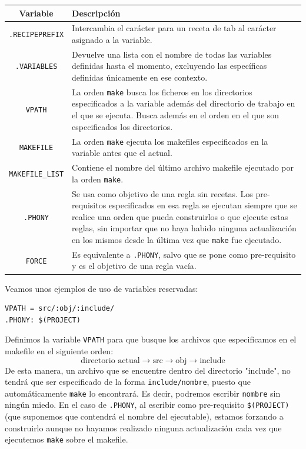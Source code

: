\documentclass[11pt,twoside,titlepage,a4paper]{article}
\theoremstyle{definition}
\theoremstyle{plain_rojo}
\theoremstyle{remark}
\begin{document}
\begin{center}
\begin{tabular}{|c|p{12.7cm}|}
\hline
	\textbf{\textcolor{burdeos}{Variable}} & 
	\textbf{\textcolor{burdeos}{Descripción}} \\
\hline
	\texttt{.RECIPEPREFIX} & 
	Intercambia el carácter para un receta de tab al carácter asignado a la 
	variable.\\
\hline
	\texttt{.VARIABLES} &
	Devuelve una lista con el nombre de todas las variables definidas hasta 
	el momento, excluyendo las específicas definidas únicamente en ese 
	contexto.\\
\hline
	\texttt{VPATH} & 
	La orden \texttt{make} busca los ficheros en los directorios
	especificados a la 	variable además del directorio de trabajo en el que
	se ejecuta. Busca además en el orden en el que son especificados los
	directorios.\\
\hline
	\texttt{MAKEFILE} & 
	La orden \texttt{make} ejecuta los makefiles especificados en la variable 
	antes que el actual.\\
\hline
	\texttt{MAKEFILE\_LIST} & 
	Contiene el nombre del último archivo makefile ejecutado por la orden 
	\texttt{make}.\\
\hline
	\texttt{.PHONY} & 
	Se usa como objetivo de una regla sin recetas. Los pre-requisitos 
	especificados en esa regla se ejecutan siempre que se realice una orden 
	que pueda construirlos o que ejecute estas reglas, sin importar que no
	haya habido ninguna actualización en los mismos desde la última vez que
	\texttt{make} fue ejecutado.\\
\hline
	\texttt{FORCE} & 
	Es equivalente a \texttt{.PHONY}, salvo que se pone como pre-requisito y 
	es el objetivo de una regla vacía.\\
\hline
\end{tabular}
\end{center}
\bigskip
Veamos unos ejemplos de uso de variables reservadas:
\bigskip
\begin{lstlisting}
VPATH = src/:obj/:include/
.PHONY: $(PROJECT)
\end{lstlisting}
\bigskip
Definimos la variable \texttt{VPATH} para que busque los archivos que 
especificamos en el makefile en el siguiente orden:
\begin{equation*}
\text{directorio actual}\to\text{src}\to\text{obj}\to\text{include}
\end{equation*}
De esta manera, un archivo que se encuentre dentro del directorio "include",
no tendrá que ser especificado de la forma \texttt{include/nombre}, puesto
que automáticamente \texttt{make} lo encontrará. Es decir, podremos escribir
\texttt{nombre} sin ningún miedo. En el caso de \texttt{.PHONY}, al escribir
como pre-requisito \texttt{\$(PROJECT)} (que suponemos que contendrá el
nombre del ejecutable), estamos forzando a construirlo aunque no hayamos 
realizado ninguna actualización cada vez que ejecutemos \texttt{make} sobre
el makefile.
\end{document}
